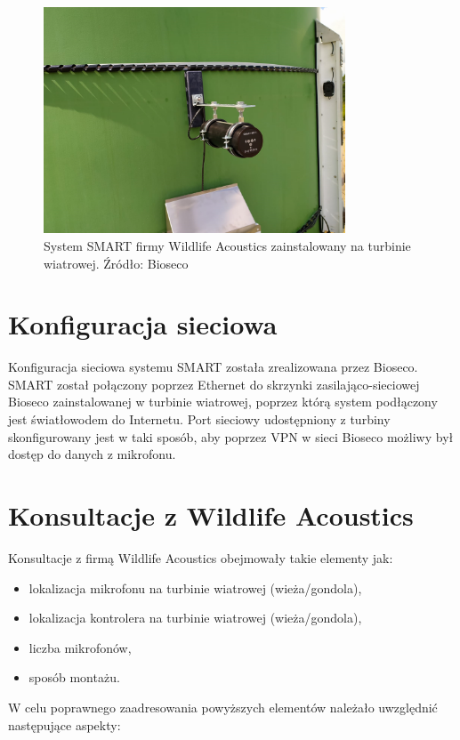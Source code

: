 \documentclass{sprz}
\begin{document}
\begin{figure}[h]
  \centering
  \includegraphics[width=0.8\textwidth]{sprz/smart-installed.png}
  \caption{System SMART firmy Wildlife Acoustics zainstalowany na turbinie wiatrowej. Źródło: Bioseco}
  \label{img:smart-installed}
\end{figure} 

\section{Konfiguracja sieciowa}
Konfiguracja sieciowa systemu SMART została zrealizowana przez Bioseco. SMART został połączony poprzez Ethernet do skrzynki zasilająco-sieciowej Bioseco zainstalowanej w turbinie wiatrowej, poprzez którą system podłączony jest światłowodem do Internetu. Port sieciowy udostępniony z turbiny skonfigurowany jest w taki sposób, aby poprzez VPN w sieci Bioseco możliwy był dostęp do danych z mikrofonu.

\section{Konsultacje z Wildlife Acoustics}
Konsultacje z firmą Wildlife Acoustics obejmowały takie elementy jak:
\begin{itemize}
  \item{lokalizacja mikrofonu na turbinie wiatrowej (wieża/gondola),}
  \item{lokalizacja kontrolera na turbinie wiatrowej (wieża/gondola),}
  \item{liczba mikrofonów,}
  \item{sposób montażu.}
\end{itemize}

W celu poprawnego zaadresowania powyższych elementów należało uwzględnić następujące aspekty:
\end{document}
